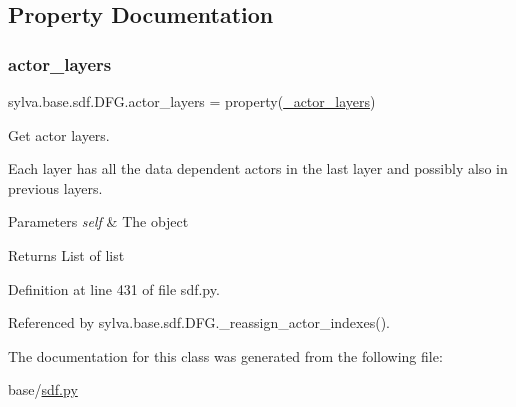 \subsection{Property Documentation}
\mbox{\label{classsylva_1_1base_1_1sdf_1_1_d_f_g_a55a9b08182b503823754256937227b9a}} 
\subsubsection{\texorpdfstring{actor\+\_\+layers}{actor\_layers}}
{\footnotesize\ttfamily sylva.\+base.\+sdf.\+D\+F\+G.\+actor\+\_\+layers = property(\hyperlink{classsylva_1_1base_1_1sdf_1_1_d_f_g_a1e8c55f1e1a5cc595466e7b3bf3fd409}{\+\_\+actor\+\_\+layers})\hspace{0.3cm}{\ttfamily [static]}}



Get actor layers. 

Each layer has all the data dependent actors in the last layer and possibly also in previous layers.


\begin{DoxyParams}{Parameters}
{\em self} & The object\\
\hline
\end{DoxyParams}
\begin{DoxyReturn}{Returns}
List of list 
\end{DoxyReturn}


Definition at line 431 of file sdf.\+py.



Referenced by sylva.\+base.\+sdf.\+D\+F\+G.\+\_\+reassign\+\_\+actor\+\_\+indexes().



The documentation for this class was generated from the following file\+:\begin{DoxyCompactItemize}
\item 
base/\hyperlink{sdf_8py}{sdf.\+py}\end{DoxyCompactItemize}

